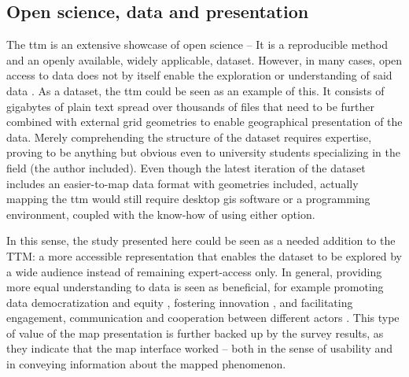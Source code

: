 \subsection{Open science, data and presentation}
The \acrshort{ttm} is an extensive showcase of open science --
It is a reproducible method and an openly available, widely applicable, dataset.
However, in many cases, open access to data does not by itself enable
the exploration or understanding of said data \parencite{obr2016}.
As a dataset, the \acrshort{ttm} could be seen as an example of this.
It consists of gigabytes of plain text spread over thousands of files
that need to be further combined with external grid geometries to enable
geographical presentation of the data.
Merely comprehending the structure of the dataset requires expertise,
proving to be anything but obvious even to university students specializing in the field
(the author included).
Even though the latest iteration of the dataset \parencite{fin2023}
includes an easier-to-map data format with geometries included,
actually mapping the \acrshort{ttm} would still require
desktop \acrshort{gis} software or a programming environment,
coupled with the know-how of using either option.

In this sense, the study presented here could be seen as a needed addition to the TTM:
a more accessible representation that enables the dataset to be explored by a wide audience
instead of remaining expert-access only.
In general, providing more equal understanding to data is seen as beneficial,
for example promoting data democratization and equity \parencite{awa2020},
fostering innovation \parencite{man2011},
and facilitating engagement, communication and cooperation between different actors
\parencite{kra2021, ket2020}.
This type of value of the map presentation is further backed up by the survey results,
as they indicate that the map interface worked --
both in the sense of usability and in conveying information about the mapped phenomenon.

